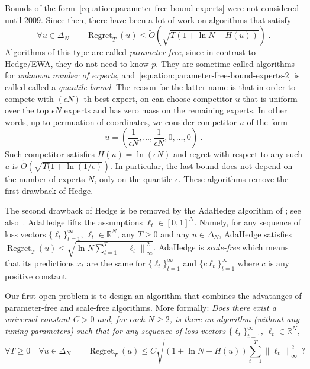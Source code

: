 \documentclass{colt2016} %
\DeclareMathOperator{\Regret}{Regret}
\newcommand{\R}{\mathbb{R}}     %
\newcommand{\norm}[1]{\left\|{#1}\right\|}
\begin{document}
Bounds of the form~\eqref{equation:parameter-free-bound-experts} were not considered
until 2009. Since then, there have been a lot of work \citep{Chaudhuri-Freund-Hsu-2009,
Chernov-Vovk-2010, Koolen-van-Erven-2015, Luo-Schapire-2015, Foster-Rakhlin-Sridharan-2015,
Orabona-Pal-2016-parameter-free} on algorithms that
satisfy
\begin{equation}
\label{equation:parameter-free-bound-experts-2}
\forall u \in \Delta_N \qquad \Regret_T(u) \le \widetilde O(\sqrt{T (1 + \ln N - H(u))}) \; .
\end{equation}
Algorithms of this type are called \emph{parameter-free}, since in contrast to
Hedge/EWA, they do not need to know $p$.
They are sometime called algorithms for \emph{unknown number of
experts}, and~\eqref{equation:parameter-free-bound-experts-2} is called
called a \emph{quantile bound}. The reason for the latter name is that in order
to compete with $(\epsilon N)$-th best expert, on can choose competitor $u$ that
is uniform over the top $\epsilon N$ experts and has zero mass on the remaining experts.
In other words, up to permuation of coordinates, we consider competitor $u$ of the form
$$
u = \left( \frac{1}{\epsilon N}, \dots, \frac{1}{\epsilon N}, 0, \dots, 0 \right) \; .
$$
Such competitor satisfies $H(u) = \ln (\epsilon N)$ and regret with respect to
any such $u$ is $\widetilde O(\sqrt{T (1 + \ln(1/\epsilon)})$. In particular,
the last bound does not depend on the number of experts $N$, only on the
quantile $\epsilon$.  These algorithms remove the first drawback of Hedge.

The second drawback of Hedge is be removed by the AdaHedge algorithm of
\cite{de-Rooij-van-Erven-Grunwald-Koolen-2014}; see
also~\citep{Orabona-Pal-2016-parameter-free}. AdaHedge lifts the assumptions
$\ell_t \in [0,1]^N$. Namely, for any sequence of loss vectors
$\{\ell_t\}_{t=1}^\infty$, $\ell_t \in \R^N$, any $T \ge 0$ and any $u \in
\Delta_N$, AdaHedge satisfies $\Regret_T(u) \le \sqrt{\ln N \sum_{t=1}^T
\norm{\ell_t}_\infty^2}$. AdaHedge is \emph{scale-free} which means that its
predictions $x_t$ are the same for $\{\ell_t\}_{t=1}^\infty$ and $\{c
\ell_t\}_{t=1}^\infty$ where $c$ is any positive constant.

Our first open problem is to design an algorithm that combines the advatanges
of parameter-free and scale-free algorithms. More formally: \emph{Does there exist a universal constant $C > 0$
and, for each $N \ge 2$, is there an algorithm (without any tuning parameters) such that for any sequence of
loss vectors $\{\ell_t\}_{t=1}^\infty$, $\ell_t \in \R^N$,
$$
\forall T \ge 0 \quad \forall u \in \Delta_N \qquad \Regret_T(u) \le C \sqrt{(1 + \ln N - H(u)) \sum_{t=1}^T \norm{\ell_t}_\infty^2} \ \ ?
$$
}
\end{document}
